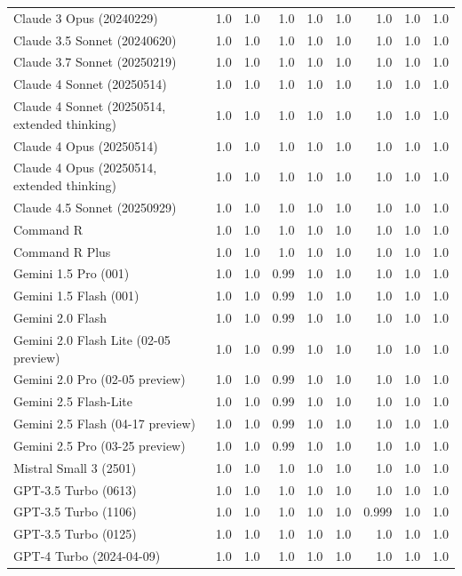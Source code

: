 \begin{table}[htp]
{\begin{tabular}{lrrrrrrrr}
Claude 3 Opus (20240229) & 1.0 & 1.0 & 1.0 & 1.0 & 1.0 & 1.0 & 1.0 & 1.0 \\
Claude 3.5 Sonnet (20240620) & 1.0 & 1.0 & 1.0 & 1.0 & 1.0 & 1.0 & 1.0 & 1.0 \\
Claude 3.7 Sonnet (20250219) & 1.0 & 1.0 & 1.0 & 1.0 & 1.0 & 1.0 & 1.0 & 1.0 \\
Claude 4 Sonnet (20250514) & 1.0 & 1.0 & 1.0 & 1.0 & 1.0 & 1.0 & 1.0 & 1.0 \\
Claude 4 Sonnet (20250514, extended thinking) & 1.0 & 1.0 & 1.0 & 1.0 & 1.0 & 1.0 & 1.0 & 1.0 \\
Claude 4 Opus (20250514) & 1.0 & 1.0 & 1.0 & 1.0 & 1.0 & 1.0 & 1.0 & 1.0 \\
Claude 4 Opus (20250514, extended thinking) & 1.0 & 1.0 & 1.0 & 1.0 & 1.0 & 1.0 & 1.0 & 1.0 \\
Claude 4.5 Sonnet (20250929) & 1.0 & 1.0 & 1.0 & 1.0 & 1.0 & 1.0 & 1.0 & 1.0 \\
Command R & 1.0 & 1.0 & 1.0 & 1.0 & 1.0 & 1.0 & 1.0 & 1.0 \\
Command R Plus & 1.0 & 1.0 & 1.0 & 1.0 & 1.0 & 1.0 & 1.0 & 1.0 \\
Gemini 1.5 Pro (001) & 1.0 & 1.0 & 0.99 & 1.0 & 1.0 & 1.0 & 1.0 & 1.0 \\
Gemini 1.5 Flash (001) & 1.0 & 1.0 & 0.99 & 1.0 & 1.0 & 1.0 & 1.0 & 1.0 \\
Gemini 2.0 Flash & 1.0 & 1.0 & 0.99 & 1.0 & 1.0 & 1.0 & 1.0 & 1.0 \\
Gemini 2.0 Flash Lite (02-05 preview) & 1.0 & 1.0 & 0.99 & 1.0 & 1.0 & 1.0 & 1.0 & 1.0 \\
Gemini 2.0 Pro (02-05 preview) & 1.0 & 1.0 & 0.99 & 1.0 & 1.0 & 1.0 & 1.0 & 1.0 \\
Gemini 2.5 Flash-Lite & 1.0 & 1.0 & 0.99 & 1.0 & 1.0 & 1.0 & 1.0 & 1.0 \\
Gemini 2.5 Flash (04-17 preview) & 1.0 & 1.0 & 0.99 & 1.0 & 1.0 & 1.0 & 1.0 & 1.0 \\
Gemini 2.5 Pro (03-25 preview) & 1.0 & 1.0 & 0.99 & 1.0 & 1.0 & 1.0 & 1.0 & 1.0 \\
Mistral Small 3 (2501) & 1.0 & 1.0 & 1.0 & 1.0 & 1.0 & 1.0 & 1.0 & 1.0 \\
GPT-3.5 Turbo (0613) & 1.0 & 1.0 & 1.0 & 1.0 & 1.0 & 1.0 & 1.0 & 1.0 \\
GPT-3.5 Turbo (1106) & 1.0 & 1.0 & 1.0 & 1.0 & 1.0 & 0.999 & 1.0 & 1.0 \\
GPT-3.5 Turbo (0125) & 1.0 & 1.0 & 1.0 & 1.0 & 1.0 & 1.0 & 1.0 & 1.0 \\
GPT-4 Turbo (2024-04-09) & 1.0 & 1.0 & 1.0 & 1.0 & 1.0 & 1.0 & 1.0 & 1.0 \\

\end{tabular}}
\end{table}
